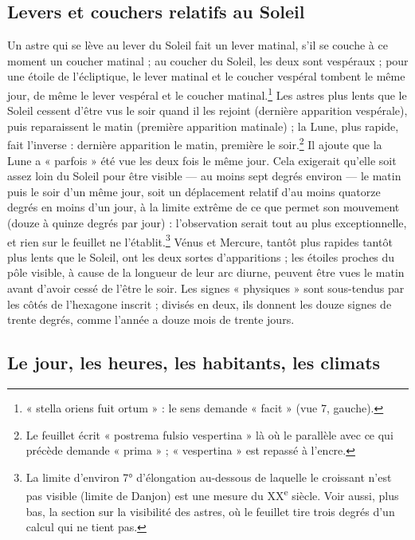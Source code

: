\documentclass[11pt,a4paper]{article}
\begin{document}
\subsection*{Levers et couchers relatifs au Soleil}

Un astre qui se lève au lever du Soleil fait un lever matinal, s'il se couche à
ce moment un coucher matinal ; au coucher du Soleil, les deux sont vespéraux ;
pour une étoile de l'écliptique, le lever matinal et le coucher vespéral tombent
le même jour, de même le lever vespéral et le coucher matinal.\footnote{« stella
oriens fuit ortum » : le sens demande « facit » (vue 7, gauche).} Les astres plus
lents que le Soleil cessent d'être vus le soir quand il les rejoint (dernière
apparition vespérale), puis reparaissent le matin (première apparition
matinale) ; la Lune, plus rapide, fait l'inverse : dernière apparition le
matin, première le soir.\footnote{Le feuillet écrit « postrema fulsio
vespertina » là où le parallèle avec ce qui précède demande « prima » ;
« vespertina » est repassé à l'encre.} Il ajoute que la Lune a « parfois » été vue
les deux fois le même jour. Cela exigerait qu'elle soit assez loin du Soleil
pour être visible — au moins sept degrés environ — le matin puis le soir d'un
même jour, soit un déplacement relatif d'au moins quatorze degrés en moins
d'un jour, à la limite extrême de ce que permet son mouvement (douze à quinze
degrés par jour) : l'observation serait tout au plus exceptionnelle, et rien sur
le feuillet ne l'établit.\footnote{La limite d'environ 7° d'élongation au-dessous
de laquelle le croissant n'est pas visible (limite de Danjon) est une mesure du
XX\textsuperscript{e} siècle. Voir aussi, plus bas, la section sur la visibilité des astres, où le feuillet
tire trois degrés d'un calcul qui ne tient pas.}
Vénus et Mercure, tantôt plus rapides tantôt plus lents que le Soleil, ont les
deux sortes d'apparitions ; les étoiles proches du pôle visible, à cause de la
longueur de leur arc diurne, peuvent être vues le matin avant d'avoir cessé de
l'être le soir. Les signes « physiques » sont sous-tendus par les côtés de
l'hexagone inscrit ; divisés en deux, ils donnent les douze signes de trente
degrés, comme l'année a douze mois de trente jours.

\subsection*{Le jour, les heures, les habitants, les climats}
\end{document}
